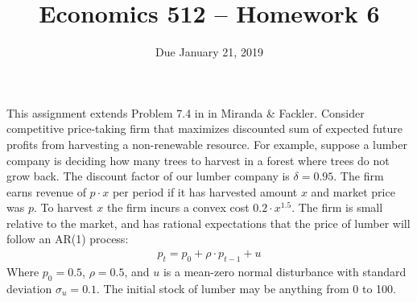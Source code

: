 \documentclass[11pt]{article}
\begin{document}
\onehalfspace

\title{Economics 512 -- Homework 6}
\author{Due January 21, 2019}
\date{}
\maketitle
This assignment extends Problem 7.4 in in Miranda \& Fackler. 
Consider competitive price-taking firm that maximizes discounted sum of expected future profits from harvesting a non-renewable resource. 
For example, suppose a lumber company is deciding how many trees to harvest in a forest where trees do not grow back. 
The discount factor of our lumber company is $\delta = 0.95$. The firm earns revenue of $p\cdot x$ per period if it has harvested amount $x$ and market price was $p$. To harvest $x$ the firm incurs a convex cost $0.2\cdot x^{1.5}$. The firm is small relative to the market, and has rational expectations that the price of lumber
will follow an AR(1) process: 
\begin{align}
p_t = p_0 + \rho\cdot p_{t-1} + u
\end{align}
Where $p_0 = 0.5$, $\rho = 0.5$, and $u$ is a mean-zero normal disturbance with standard deviation $\sigma_u=0.1$.
The initial stock of lumber may be anything from 0 to 100.
\end{document}
